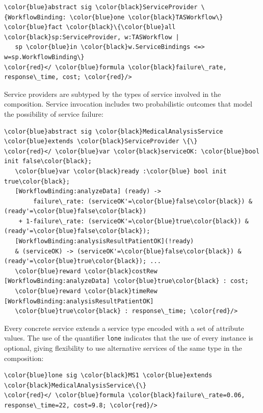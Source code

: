 \documentclass[10pt,journal,compsoc]{IEEEtran}
\begin{document}
{\scriptsize
\begin{Verbatim}[commandchars=\\\{\},codes={\catcode`$=3\catcode`^=7\catcode`_=8}]
\color{blue}abstract sig \color{black}ServiceProvider \{WorkflowBinding: \color{blue}one \color{black}TASWorkflow\}
\color{blue}fact \color{black}\{\color{blue}all \color{black}sp:ServiceProvider, w:TASWorkflow | 
   sp \color{blue}in \color{black}w.ServiceBindings <=> w=sp.WorkflowBinding\}
\color{red}</ \color{blue}formula \color{black}failure\_rate, response\_time, cost; \color{red}/>
\end{Verbatim}
}

Service providers are subtyped by the types of service involved in the composition. Service invocation includes two probabilistic outcomes that model the possibility of service failure:

{\scriptsize
\begin{Verbatim}[commandchars=\\\{\},codes={\catcode`$=3\catcode`^=7\catcode`_=8}]
\color{blue}abstract sig \color{black}MedicalAnalysisService \color{blue}extends \color{black}ServiceProvider \{\}
\color{red}</ \color{blue}var \color{black}serviceOK: \color{blue}bool init false\color{black};
   \color{blue}var \color{black}ready :\color{blue} bool init true\color{black};
   [WorkflowBinding:analyzeData] (ready) -> 
        failure\_rate: (serviceOK'=\color{blue}false\color{black}) & (ready'=\color{blue}false\color{black}) 
    + 1-failure\_rate: (serviceOK'=\color{blue}true\color{black}) & (ready'=\color{blue}false\color{black});
   [WorkflowBinding:analysisResultPatientOK](!ready) 
   & (serviceOK) -> (serviceOK'=\color{blue}false\color{black}) & (ready'=\color{blue}true\color{black}); ...
   \color{blue}reward \color{black}costRew [WorkflowBinding:analyzeData] \color{blue}true\color{black} : cost;
   \color{blue}reward \color{black}timeRew [WorkflowBinding:analysisResultPatientOK]
   \color{blue}true\color{black} : response\_time; \color{red}/>
\end{Verbatim}
}

Every concrete service extends a service type encoded with a set of attribute values. 
The use of the quantifier {\tt lone} indicates that the use of every instance is optional, giving flexibility to use alternative services of the same type in the composition: 

{\scriptsize
\begin{Verbatim}[commandchars=\\\{\},codes={\catcode`$=3\catcode`^=7\catcode`_=8}]
\color{blue}lone sig \color{black}MS1 \color{blue}extends \color{black}MedicalAnalysisService\{\}
\color{red}</ \color{blue}formula \color{black}failure\_rate=0.06, response\_time=22, cost=9.8; \color{red}/>
\end{Verbatim}
}
\end{document}
